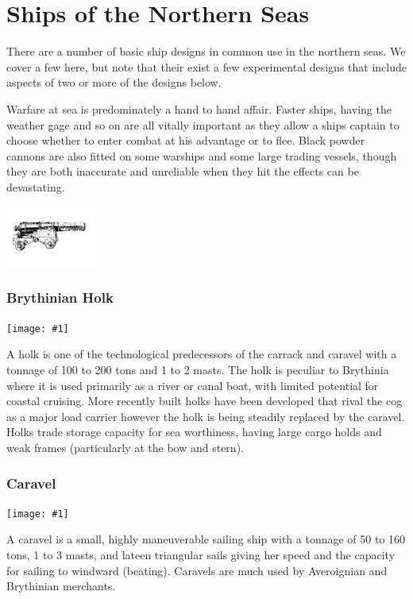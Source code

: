 \documentclass[a4paper]{dnd5}
\newcommand\inc[1]{
 \texttt{[image: \#1]}
}
\begin{document}
\section*{Ships of the Northern Seas}


There are a number of basic ship designs in common use in the northern seas.  We cover a few here, but note that their exist a few experimental designs that include aspects of two or more of the designs below.

Warfare at sea is predominately a hand to hand affair.  Faster ships, having the weather gage and so on are all vitally important as they allow a ships captain to choose whether to enter combat at his advantage or to flee.  Black powder cannons are also fitted on some warships and some large trading vessels, though they are both inaccurate and unreliable when they hit the effects can be devastating.

 \includegraphics[width=0.22\textwidth]{ship_cannon.jpg}



\subsubsection*{Brythinian Holk}
\inc{brythynian_holk.jpg}

A holk is one of the technological predecessors of the carrack and caravel with a tonnage of 100 to 200 tons and 1 to 2 masts. The holk is peculiar to Brythinia where it is used primarily as a river or canal boat, with limited potential for coastal cruising.  More recently built holks have been developed that rival the cog as a major load carrier however the holk is being steadily replaced by the caravel.  Holks trade storage capacity for sea worthiness, having large cargo holds and weak frames (particularly at the bow and stern).

\subsubsection*{Caravel}
\inc{caravel.jpg}

A caravel is a small, highly maneuverable sailing ship with a tonnage of 50 to 160 tons, 1 to 3 masts, and lateen triangular sails giving her speed and the capacity for sailing to windward (beating). Caravels are much used by Averoignian and Brythinian merchants.
\end{document}
